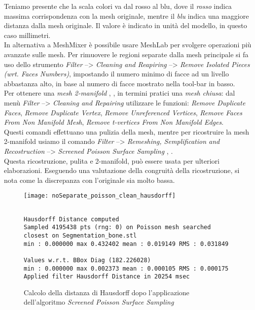 Teniamo presente che la scala colori va dal rosso al blu, dove il \emph{rosso} indica massima corrispondenza con la mesh originale, mentre il \emph{blu} indica una maggiore distanza dalla mesh originale. Il valore è indicato in unità del modello, in questo caso millimetri.\\
In alternativa a MeshMixer è possibile usare MeshLab per svolgere operazioni più avanzate sulle mesh.
Per rimuovere le regioni separate dalla mesh principale si fa uso dello strumento \emph{Filter} --> \emph{Cleaning and Reapiring} --> \emph{Remove Isolated Pieces (wrt. Faces Numbers)}, impostando il numero minimo di facce ad un livello abbastanza alto, in base al numero di facce mostrato nella tool-bar in basso.\\
Per ottenere una \emph{mesh 2-manifold} \parencite{Reference92}, \parencite{Reference93}, in termini pratici una \emph{mesh chiusa}: dal menù \emph{Filter} --> \emph{Cleaning and Repairing} utilizzare le funzioni: \emph{Remove Duplicate Faces}, \emph{Remove Duplicate Vertex}, \emph{Remove Unreferenced Vertices}, \emph{Remove Faces From Non Manifold Mesh}, \emph{Remove t-vertices From Non Manifold Edges}.\\ Questi comandi effettuano una pulizia della mesh, mentre per ricostruire la mesh 2-manifold usiamo il comando \emph{Filter} --> \emph{Remeshing, Semplification and Recostruction} --> \emph{Screened Poisson Surface Sampling} \parencite{Reference95}, \parencite{Reference96}.\\ Questa ricostruzione, pulita e 2-manifold, può essere usata per ulteriori elaborazioni. Eseguendo una valutazione della congruità della ricostruzione, si nota come la discrepanza con l'originale sia molto bassa.\\
\begin{figure}[h]
\centering
\texttt{[image: noSeparate\_poisson\_clean\_hausdorff]}
\caption[LoF entry]{Calcolo della distanza di Hausdorff dopo l'applicazione dell'algoritmo \emph{Screened Poisson Surface Sampling}}
\begin{lstlisting}

Hausdorff Distance computed
Sampled 4195438 pts (rng: 0) on Poisson mesh searched 
closest on Segmentation_bone.stl
min : 0.000000 max 0.432402 mean : 0.019149 RMS : 0.031849

Values w.r.t. BBox Diag (182.226028)
min : 0.000000 max 0.002373 mean : 0.000105 RMS : 0.000175 
Applied filter Hausdorff Distance in 20254 msec
\end{lstlisting}

\label{fig:noSeparate_poisson_clean_hausdorff}
\end{figure}
\\

